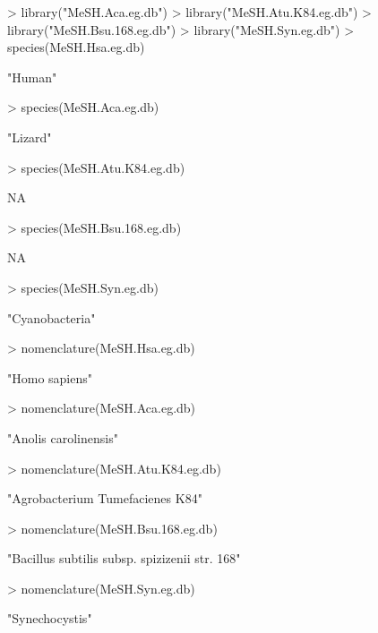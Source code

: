 \documentclass[11pt]{article}
\begin{document}
\begin{center}
\begin{Schunk}
\begin{Sinput}
> library("MeSH.Aca.eg.db")
> library("MeSH.Atu.K84.eg.db")
> library("MeSH.Bsu.168.eg.db")
> library("MeSH.Syn.eg.db")
> species(MeSH.Hsa.eg.db)
\end{Sinput}
\begin{Soutput}
[1] "Human"
\end{Soutput}
\begin{Sinput}
> species(MeSH.Aca.eg.db)
\end{Sinput}
\begin{Soutput}
[1] "Lizard"
\end{Soutput}
\begin{Sinput}
> species(MeSH.Atu.K84.eg.db)
\end{Sinput}
\begin{Soutput}
[1] NA
\end{Soutput}
\begin{Sinput}
> species(MeSH.Bsu.168.eg.db)
\end{Sinput}
\begin{Soutput}
[1] NA
\end{Soutput}
\begin{Sinput}
> species(MeSH.Syn.eg.db)
\end{Sinput}
\begin{Soutput}
[1] "Cyanobacteria"
\end{Soutput}
\begin{Sinput}
> nomenclature(MeSH.Hsa.eg.db)
\end{Sinput}
\begin{Soutput}
[1] "Homo sapiens"
\end{Soutput}
\begin{Sinput}
> nomenclature(MeSH.Aca.eg.db)
\end{Sinput}
\begin{Soutput}
[1] "Anolis carolinensis"
\end{Soutput}
\begin{Sinput}
> nomenclature(MeSH.Atu.K84.eg.db)
\end{Sinput}
\begin{Soutput}
[1] "Agrobacterium Tumefacienes K84"
\end{Soutput}
\begin{Sinput}
> nomenclature(MeSH.Bsu.168.eg.db)
\end{Sinput}
\begin{Soutput}
[1] "Bacillus subtilis subsp. spizizenii str. 168"
\end{Soutput}
\begin{Sinput}
> nomenclature(MeSH.Syn.eg.db)
\end{Sinput}
\begin{Soutput}
[1] "Synechocystis"
\end{Soutput}
\end{Schunk}
\end{center}
\end{document}
